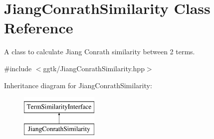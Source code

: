 \hypertarget{classJiangConrathSimilarity}{}\section{Jiang\+Conrath\+Similarity Class Reference}
\label{classJiangConrathSimilarity}


A class to calculate Jiang Conrath similarity between 2 terms.  




{\ttfamily \#include $<$ggtk/\+Jiang\+Conrath\+Similarity.\+hpp$>$}

Inheritance diagram for Jiang\+Conrath\+Similarity\+:\begin{figure}[H]
\begin{center}
\leavevmode
\includegraphics[height=2.000000cm]{classJiangConrathSimilarity}
\end{center}
\end{figure}
